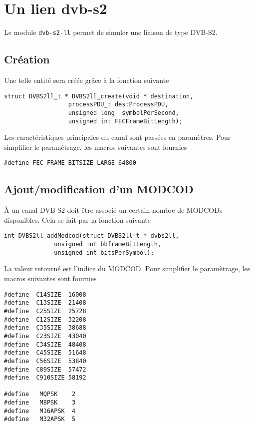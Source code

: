 %
\section{Un lien {\sc dvb-s2}}

   Le module {\tt dvb-s2-ll} permet de simuler une liaison de type
DVB-S2.

\subsection{Création}

Une telle entité sera créée grâce à la fonction suivante

\begin{verbatim}
struct DVBS2ll_t * DVBS2ll_create(void * destination,
				  processPDU_t destProcessPDU,
				  unsigned long  symbolPerSecond,
				  unsigned int FECFrameBitLength);
\end{verbatim}

   Les caractéristiques principales du canal sont passées en
   paramètres.
Pour simplifier le
paramètrage, les macros suivantes sont fournies

\begin{verbatim}
#define FEC_FRAME_BITSIZE_LARGE 64800
\end{verbatim}

\subsection{Ajout/modification d'un MODCOD}

   À un canal DVB-S2 doit être associé un certain nombre de MODCODs
disponibles. Cela se fait par la fonction suivante

\begin{verbatim}
int DVBS2ll_addModcod(struct DVBS2ll_t * dvbs2ll,
		      unsigned int bbframeBitLength,
		      unsigned int bitsPerSymbol);
\end{verbatim}

   La valeur retourné est l'indice du MODCOD. Pour simplifier le
paramètrage, les macros suivantes sont fournies

\begin{verbatim}
#define  C14SIZE  16008
#define  C13SIZE  21408
#define  C25SIZE  25728
#define  C12SIZE  32208
#define  C35SIZE  38688
#define  C23SIZE  43040
#define  C34SIZE  48408
#define  C45SIZE  51648
#define  C56SIZE  53840
#define  C89SIZE  57472
#define  C910SIZE 58192

#define   MQPSK    2
#define   M8PSK    3
#define   M16APSK  4
#define   M32APSK  5
\end{verbatim}

